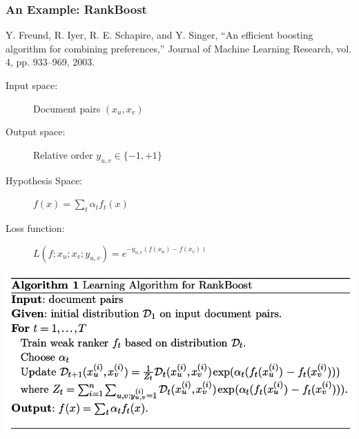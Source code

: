 \documentclass{beamer}
\begin{document}
\begin{frame}
    \frametitle{An Example: RankBoost}
    \begin{minipage}{1.0\linewidth}
        \footnotesize Y. Freund, R. Iyer, R. E. Schapire, and Y. Singer, ``An
        efficient boosting algorithm for combining preferences,'' Journal of
        Machine Learning Research, vol. 4, pp. 933--969, 2003.
    \end{minipage}
    \vfill
    \begin{description}
    \item[Input space:] Document pairs $(x_u,x_v)$
    \item[Output space:] Relative order $y_{u,v} \in \{-1,+1\}$
    \item[Hypothesis Space:] $f(x) = \sum_t\alpha_tf_t(x)$ 
    \item[Loss function:] $L(f; x_u; x_v; y_{u,v}) = e^{-y_{u,v}(f(x_u)-f(x_v))}$
    \end{description}
    \vfill
    \centering
    \includegraphics[width=\linewidth]{rankboost}

\end{frame}

\end{document}
